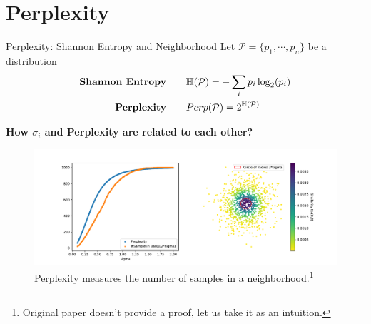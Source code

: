 \documentclass[10pt]{beamer}
\theoremstyle{definition}
\newcommand{\HBB}{\mathbb{H}}
\newcommand{\1}{\mathbbm{1}}
\newcommand{\PP}{\mathcal{P}}
\begin{document}
\section{Perplexity}
\begin{frame}{Perplexity: Shannon Entropy and Neighborhood}{}
  \vfill
  Let $ \PP=\{p_1, \cdots, p_n\}$ be a distribution
  \begin{equation*}
    \begin{aligned}
      \mbox{\bf Shannon Entropy}\qquad &\HBB(\PP) =
      -\sum_i p_i\log_2(p_i)\\
      \mbox{\bf Perplexity} \qquad & Perp(\PP) = 2^{\HBB(\PP)}\\
    \end{aligned}
    \label{entropy}
  \end{equation*}
  \begin{minipage}[h!]{\textwidth}
    {\bf How $\sigma_i$ and Perplexity are related to each other?}
    \begin{figure}[h!]
      \centering
      \includegraphics[clip, scale=0.32, trim=0 0 0
      1cm]{./pic/perplexity.pdf}
      \caption{Perplexity measures the number of samples in a
        neighborhood.\footnote{Original paper doesn't provide a proof, let us
      take it as an intuition.}}
    \end{figure}
  \end{minipage}
\end{frame}
\end{document}
